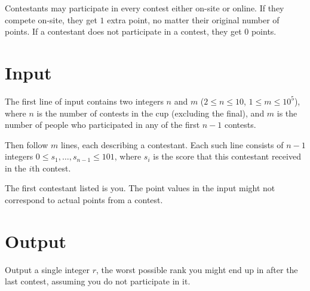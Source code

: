Contestants may participate in every contest either on-site or online.
If they compete on-site, they get $1$ extra point, no matter their
original number of points.  If a contestant does not participate in a
contest, they get $0$ points.


\section*{Input}

The first line of input contains two integers $n$ and $m$ ($2 \le n \le 10$, $1
\le m \le 10^5$), where $n$ is the number of contests in the cup
(excluding the final), and $m$ is the number of people who
participated in any of the first $n-1$ contests.

Then follow $m$ lines, each describing a contestant.  Each such line
consists of $n-1$ integers $0 \le s_1, \ldots, s_{n-1} \le 101$, where
$s_i$ is the score that this contestant received in the $i$th contest.

The first contestant listed is you.  The point values in the input
might not correspond to actual points from a contest.

\section*{Output}

Output a single integer $r$, the worst possible rank you might end up
in after the last contest, assuming you do not participate in it.
